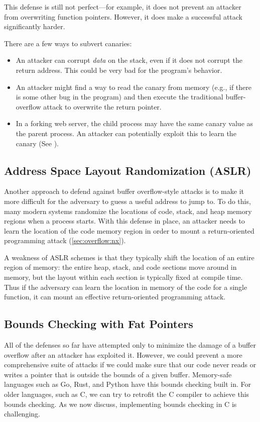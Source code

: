 This defense is still not perfect---for example,
it does not prevent an attacker from overwriting
function pointers. However, it does make
a successful attack significantly harder.

There are a few ways to subvert canaries:
\begin{itemize}
\item An attacker can corrupt \emph{data} on the stack, even if it does not
      corrupt the return address. This could be very bad for the program's behavior.
\item An attacker might find a way to read the canary from memory (e.g.,
      if there is some other bug in the program) and then execute the traditional
      buffer-overflow attack to overwrite the return pointer.
\item In a forking web server, the child process may have the same canary value
      as the parent process. An attacker can potentially exploit this 
      to learn the canary (See \cite{bittau2014hacking}).
\end{itemize}

\subsection{Address Space Layout Randomization (ASLR)}
Another approach to defend against buffer overflow-style
attacks is to make it more difficult for the adversary to
guess a useful address to jump to.
To do this, many modern systems randomize the locations of
code, stack, and heap memory regions when a process starts.
With this defense in place, an
attacker needs to learn the location of the code
memory region in order to mount a 
return-oriented programming attack (\cref{sec:overflow:nx}).

A weakness of 
ASLR schemes is that they typically shift the location of an entire 
region of memory: the entire heap, stack, and code sections 
move around in memory, but the layout within each section
is typically fixed at compile time.
Thus if the adversary can learn the location in memory 
of the code for a single function, it can mount
an effective return-oriented programming attack.


\subsection{Bounds Checking with Fat Pointers}
All of the defenses so far have attempted only to minimize the damage of a buffer overflow after an attacker has exploited it. However, we could prevent a more comprehensive suite of attacks if we could make sure that our code never reads or writes a pointer that is outside the bounds of a given buffer. Memory-safe languages such as Go, Rust, and Python have this bounds checking built in.
For older languages, such as C, we can try to retrofit the C compiler 
to achieve this bounds checking.
As we now discuss, implementing bounds checking in C is challenging.

